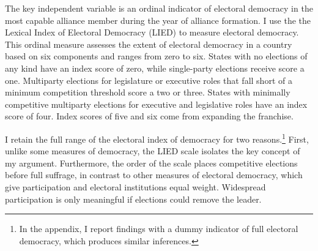 \documentclass[12pt]{article}
\begin{document}
%
%
%
%


The key independent variable is an ordinal indicator of electoral democracy in the most capable alliance member during the year of alliance formation. 
I use the the Lexical Index of Electoral Democracy (LIED) \citep{Skaaningetal2015} to measure electoral democracy.
This ordinal measure assesses the extent of electoral democracy in a country based on six components and ranges from zero to six.  
States with no elections of any kind have an index score of zero, while single-party elections receive score a one. 
Multiparty elections for legislature or executive roles that fall short of a minimum competition threshold score a two or three. 
States with minimally competitive multiparty elections for executive and legislative roles have an index score of four.
Index scores of five and six come from expanding the franchise.


I retain the full range of the electoral index of democracy for two reasons.\footnote{In the appendix, I report findings with a dummy indicator of full electoral democracy, which produces similar inferences.}
First, unlike some measures of democracy, the LIED scale isolates the key concept of my argument.
Furthermore, the order of the scale places competitive elections before full suffrage, in contrast to other measures of electoral democracy, which give participation and electoral institutions equal weight. 
Widespread participation is only meaningful if elections could remove the leader.
\end{document}
